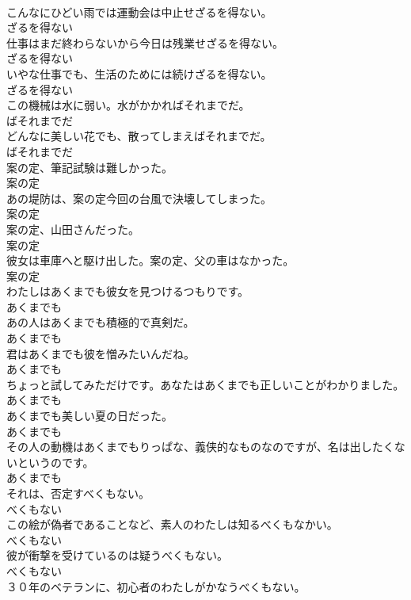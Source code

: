 \documentclass[8pt]{extreport}
\begin{document}
\begin{CJK}{UTF8}{min}
\\	こんなにひどい雨では運動会は中止せざるを得ない。	
\\	ざるを得ない
\\	仕事はまだ終わらないから今日は残業せざるを得ない。	
\\	ざるを得ない
\\	いやな仕事でも、生活のためには続けざるを得ない。	
\\	ざるを得ない
\\	この機械は水に弱い。水がかかればそれまでだ。	
\\	ばそれまでだ
\\	どんなに美しい花でも、散ってしまえばそれまでだ。	
\\	ばそれまでだ
\\	案の定、筆記試験は難しかった。	
\\	案の定
\\	あの堤防は、案の定今回の台風で決壊してしまった。	
\\	案の定
\\	案の定、山田さんだった。	
\\	案の定
\\	彼女は車庫へと駆け出した。案の定、父の車はなかった。	
\\	案の定
\\	わたしはあくまでも彼女を見つけるつもりです。	
\\	あくまでも
\\	あの人はあくまでも積極的で真剣だ。	
\\	あくまでも
\\	君はあくまでも彼を憎みたいんだね。	
\\	あくまでも
\\	ちょっと試してみただけです。あなたはあくまでも正しいことがわかりました。	
\\	あくまでも
\\	あくまでも美しい夏の日だった。	
\\	あくまでも
\\	その人の動機はあくまでもりっぱな、義侠的なものなのですが、名は出したくないというのです。	
\\	あくまでも
\\	それは、否定すべくもない。	
\\	べくもない
\\	この絵が偽者であることなど、素人のわたしは知るべくもなかい。	
\\	べくもない
\\	彼が衝撃を受けているのは疑うべくもない。	
\\	べくもない
\\	３０年のベテランに、初心者のわたしがかなうべくもない。	

\end{CJK}
\end{document}
